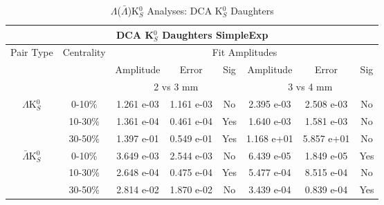 \documentclass[../AnalysisNoteJBuxton.tex]{subfiles}
\begin{document}
\begin{table}
 \centering
 \begin{tabular}{|c|c|c|c|c||c|c|c|}
  \multicolumn{8}{c}{DCA K$^{0}_{S}$ Daughters SimpleExp} \\
  \hline
  \multirow{3}{*}{Pair Type} & \multirow{3}{*}{Centrality} & \multicolumn{6}{c|}{Fit Amplitudes} \\
  \cline{3-8}
   & & Amplitude & Error & Sig & Amplitude & Error & Sig \\  
  \cline{3-8}
   & & \multicolumn{3}{c||}{2 vs 3 mm} & \multicolumn{3}{c|}{3 vs 4 mm} \\  
  \hline  
  \multirow{3}{*}{$\Lambda$K$^{0}_{S}$}  
   &  0-10\% & 1.261 e-03 & 1.161 e-03 & No & 2.395 e-03 & 2.508 e-03 & No \\
   & 10-30\% & 1.361 e-04 & 0.461 e-04 & Yes & 1.640 e-03 & 1.581 e-03 & No \\
   & 30-50\% & 1.397 e-01 & 0.549 e-01 & Yes & 1.168 e+01 & 5.857 e+01 & No \\
  \hline  
  \multirow{3}{*}{$\bar{\Lambda}$K$^{0}_{S}$}  
   &  0-10\% & 3.649 e-03 & 2.544 e-03 & No & 6.439 e-05 & 1.849 e-05 & Yes \\
   & 10-30\% & 2.648 e-04 & 0.475 e-04 & Yes & 5.477 e-04 & 8.515 e-04 & No \\
   & 30-50\% & 2.814 e-02 & 1.870 e-02 & No & 3.439 e-04 & 0.839 e-04 & Yes \\
  \hline
 \end{tabular}
 \caption{$\Lambda$($\bar{\Lambda}$)K$^{0}_{S}$ Analyses: DCA K$^{0}_{S}$ Daughters}
 \label{tab:K0DaughtersDcaLamK0_SimpleExp}
\end{table}
\end{document}
